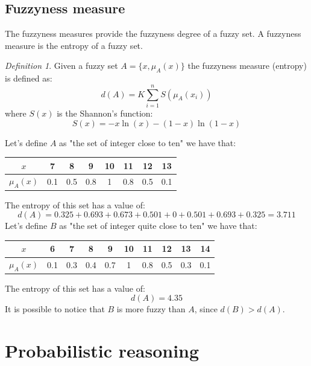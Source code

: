 \documentclass[12pt, a4paper]{report}
\theoremstyle{remark}
\newtheorem*{remark}{Definition}
\begin{document}
    \section{Fuzzyness measure}
    The fuzzyness measures provide the fuzzyness degree of a fuzzy set. A fuzzyness measure is the entropy of a fuzzy set. 
    \begin{remark}
        Given a fuzzy set $A=\{x,\mu_A(x)\}$ the fuzzyness measure (entropy) is defined as:
        \[d(A)=K \sum_{i=1}^{n}S(\mu_A(x_i))\]
        where $S(x)$ is the Shannon's function: 
        \[S(x)=-x \ln(x)-(1-x)\ln(1-x)\]
    \end{remark}
    \begin{example}
        Let's define $A$ as "the set of integer close to ten" we have that:
        \begin{center}
            \begin{tabular}{ | c | c | c | c | c | c | c | c | } 
            \hline
                $x$ & 7 & 8 & 9 & 10 & 11 & 12 & 13 \\ 
            \hline
                $\mu_A(x)$ & 0.1 & 0.5 & 0.8 & 1 & 0.8 & 0.5 & 0.1 \\ 
            \hline
            \end{tabular}
        \end{center}
        The entropy of this set has a value of: 
        \[d(A)=0.325+0.693+0.673+0.501+0+0.501+0.693+0.325=3.711\]
        Let's define $B$ as "the set of integer quite close to ten" we have that:
        \begin{center}
            \begin{tabular}{ | c | c | c | c | c | c | c | c | c | c | } 
            \hline
                $x$ & 6 & 7 & 8 & 9 & 10 & 11 & 12 & 13 & 14 \\ 
            \hline
                $\mu_A(x)$ & 0.1 & 0.3 & 0.4 & 0.7 & 1 & 0.8 & 0.5 & 0.3 & 0.1 \\ 
            \hline
            \end{tabular}
        \end{center}
        The entropy of this set has a value of: 
        \[d(A)=4.35\]
        It is possible to notice that $B$ is more fuzzy than $A$, since $d(B)>d(A)$.
    
    \end{example}
    






    \newpage

    \chapter{Probabilistic reasoning}
\end{document}
